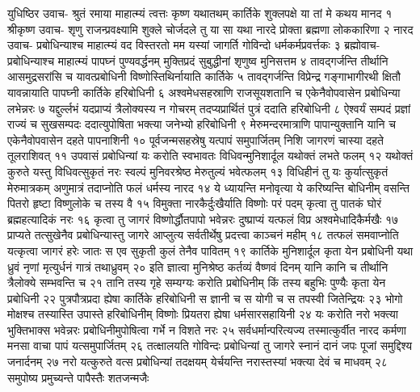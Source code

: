 
युधिष्ठिर उवाच-
श्रुतं रमाया माहात्म्यं त्वत्तः कृष्ण यथातथम् 
कार्तिके शुक्लपक्षे या तां मे कथय मानद १
श्रीकृष्ण उवाच-
शृणु राजन्प्रवक्ष्यामि शुक्ले चोर्जदले तु या 
सा यथा नारदे प्रोक्ता ब्रह्मणा लोककारिणा २
नारद उवाच-
प्रबोधिन्याश्च माहात्म्यं वद विस्तरतो मम 
यस्यां जागर्ति गोविन्दो धर्मकर्मप्रवर्त्तकः ३
ब्रह्मोवाच-
प्रबोधिन्याश्च माहात्म्यं पापघ्नं पुण्यवर्द्धनम् 
मुक्तिप्रदं सुबुद्धीनां शृणुष्व मुनिसत्तम ४
तावद्गर्जन्ति तीर्थानि आसमुद्रसरांसि च 
यावत्प्रबोधिनी विष्णोस्तिथिर्नायाति कार्तिके ५
तावद्गर्जन्ति विप्रेन्द्र गङ्गाभागीरथी क्षितौ 
यावन्नायाति पापघ्नी कार्तिके हरिबोधिनी ६
अश्वमेधसहस्राणि राजसूयशतानि च 
एकेनैवोपवासेन प्रबोधिन्या लभेन्नरः ७
यद्दुर्ल्लभं यदप्राप्यं त्रैलोक्यस्य न गोचरम् 
तदप्यप्रार्थितं पुत्रं ददाति हरिबोधिनी ८
ऐश्वर्यं सम्पदं प्रज्ञां राज्यं च सुखसम्पदः 
ददात्युपोषिता भक्त्या जनेभ्यो हरिबोधिनी ९
मेरुमन्दरमात्राणि पापान्युक्तानि यानि च 
एकेनैवोपवासेन दहते पापनाशिनी १०
पूर्वजन्मसहस्रेषु यत्पापं समुपार्जितम् 
निशि जागरणं चास्या दहते तूलराशिवत् ११
उपवासं प्रबोधिन्यां यः करोति स्वभावतः 
विधिवन्मुनिशार्दूल यथोक्तं लभते फलम् १२
यथोक्तं कुरुते यस्तु विधिवत्सुकृतं नरः 
स्वल्पं मुनिवरश्रेष्ठ मेरुतुल्यं भवेत्फलम् १३
विधिहीनं तु यः कुर्यात्सुकृतं मेरुमात्रकम् 
अणुमात्रं तदाप्नोति फलं धर्मस्य नारद १४
ये ध्यायन्ति मनोवृत्या ये करिष्यन्ति बोधिनीम् 
वसन्ति पितरो हृष्टा विष्णुलोके च तस्य वै १५
विमुक्ता नारकैर्दुःखैर्याति विष्णोः परं पदम् 
कृत्वा तु पातकं घोरं ब्रह्महत्यादिकं नरः १६
कृत्वा तु जागरं विष्णोर्द्धौतपापो भवेन्नरः 
दुष्प्राप्यं यत्फलं विप्र अश्वमेधादिकैर्मखैः १७
प्राप्यते तत्सुखेनैव प्रबोधिन्यास्तु जागरे 
आप्लुत्य सर्वतीर्थेषु प्रदत्त्वा काञ्चनं महीम् १८
तत्फलं समवाप्नोति यत्कृत्वा जागरं हरेः 
जातः स एव सुकृती कुलं तेनैव पावितम् १९
कार्तिके मुनिशार्दूल कृता येन प्रबोधिनी 
यथा ध्रुवं नृणां मृत्युर्धनं गात्रं तथाध्रुवम् २०
इति ज्ञात्वा मुनिश्रेष्ठ कर्तव्यं वैष्णवं दिनम् 
यानि कानि च तीर्थानि त्रैलोक्ये सम्भवन्ति च २१
तानि तस्य गृहे सम्यग्यः करोति प्रबोधिनीम् 
किं तस्य बहुभिः पुण्यैः कृता येन प्रबोधिनी २२
पुत्रपौत्रप्रदा ह्येषा कार्तिके हरिबोधिनी 
स ज्ञानी च स योगी च स तपस्वी जितेन्द्रियः २३
भोगो मोक्षश्च तस्यास्ति उपास्ते हरिबोधिनीम् 
विष्णोः प्रियतरा ह्येषा धर्मसारसहायिनी २४
यः करोति नरो भक्त्या भुक्तिभाक्स भवेन्नरः 
प्रबोधिनीमुपोषित्वा गर्भे न विशते नरः २५
सर्वधर्मान्परित्यज्य तस्मात्कुर्वीत नारद 
कर्मणा मनसा वाचा पापं यत्समुपार्जितम् २६
तत्क्षालयति गोविन्दः प्रबोधिन्यां तु जागरे 
स्नानं दानं जपः पूजां समुद्दिश्य जनार्दनम् २७
नरो यत्कुरुते वत्स प्रबोधिन्यां तदक्षयम् 
येर्चयन्ति नरास्तस्यां भक्त्या देवं च माधवम् २८
समुपोष्य प्रमुच्यन्ते पापैस्तैः शतजन्मजैः 
